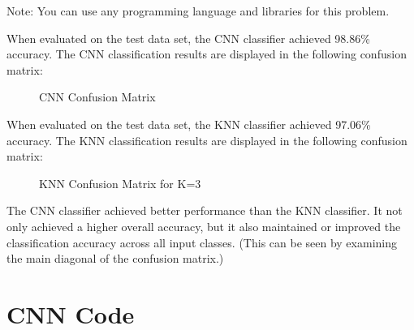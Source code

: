 \documentclass[fleqn]{article}
\begin{document}
\begin{enumerate}
		Note: You can use any programming language and libraries for this \newline problem.
		
		\pagebreak
		
		When evaluated on the test data set, the CNN classifier achieved 98.86\% accuracy. The CNN classification results are displayed in the following confusion matrix:
		
		\begin{figure}[H]
			\centerline{}
			\caption{CNN Confusion Matrix}
			\label{cnn_confusion_matrix}
		\end{figure}
		
		When evaluated on the test data set, the KNN classifier achieved 97.06\% accuracy. The KNN classification results are displayed in the following confusion matrix:
		
		\begin{figure}[H]
			\centerline{}
			\caption{KNN Confusion Matrix for K=3}
			\label{knn_confusion_matrix}
		\end{figure}		
	
		The CNN classifier achieved better performance than the KNN classifier. It not only achieved a higher overall accuracy, but it also maintained or improved the classification accuracy across all input classes. (This can be seen by examining the main diagonal of the confusion matrix.)
	
	\end{enumerate}
	
	\pagebreak
	\appendix
	\section{CNN Code}
	\label{cnn_code}
	\lstset{style=Matlab-editor,basicstyle=\ttfamily\footnotesize}
	
	
	
	\raggedbottom
\end{document}
